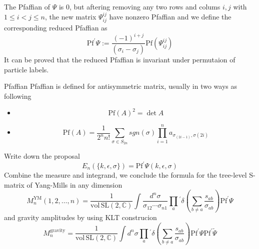 \documentclass{beamer}
\begin{document}
\begin{frame}
    The Pfaffian of $\Psi$ is 0, but aftering removing any two rows and colums $i,j$ with $1\leq i< j\leq n$, 
    the new matrix $\Psi_{ij}^{ij}$ have nonzero Pfaffian and we define the corresponding reduced Pfaffian as
    \begin{equation*}
            \boxed{
            \mathrm{Pf}^{\prime}\Psi:=\frac{(-1)^{i+j}}{(\sigma_i-\sigma_j)}\mathrm{Pf}(\Psi_{ij}^{ij})}
    \end{equation*}
    It can be proved that the reduced Pfaffian is invariant under permutaion of \alert{particle labels}.
    
    \begin{alertblock}{Pfaffian}
        Pfaffian is defined for antisymmetric matrix, usually in two ways as following
        \begin{itemize}
            \item \begin{equation*}
                \mathrm{Pf}(A)^2=\det A
            \end{equation*}
            \item \begin{equation*}
                \mathrm{Pf}(A)=\frac{1}{2^n n!}\sum_{\sigma \in S_{2n}}sgn(\sigma)\prod_{i=1}^n a_{\sigma_{(2i-1)},\sigma(2i)}
            \end{equation*}
        \end{itemize}
    \end{alertblock}
\end{frame}
\begin{frame}
    Write down the proposal
    \alert{
    \begin{equation*}
        E_n(\{k,\epsilon,\sigma\})=\mathrm{Pf}^\prime \Psi(k,\epsilon,\sigma)
    \end{equation*}}
    Combine the measure and integrand, we conclude the formula for the tree-level S-matrix of Yang-Mills in any dimension
    \begin{equation*}
        M_n^{\mathrm{YM}}(1,2,\dots,n)=\frac{1}{\mathrm{vol\,SL}(2,\mathbb{C})}\int\frac{d^n\sigma}{\sigma_{12}\cdots\sigma_{n1}}\prod_{a}{}^{\prime}\delta{\left(\sum_{b\neq a}\frac{s_{ab}}{\sigma_{ab}}\right)}\mathrm{Pf}^{\prime}\Psi
    \end{equation*}
    and gravity amplitudes by using KLT construcion
    \begin{equation*}
        M_n^{\mathrm{gravity}}=\frac{1}{\mathrm{vol\,SL}(2,\mathbb{C})}\int d^n\sigma\prod_{a}{}^{\prime}\delta{\left(\sum_{b\neq a}\frac{s_{ab}}{\sigma_{ab}}\right)}\mathrm{Pf}^{\prime}\Psi\mathrm{Pf}^{\prime}\tilde{\Psi}
    \end{equation*}
\end{frame}
\end{document}
